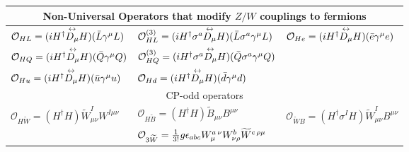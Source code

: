 \begin{table}[h]
\begin{center}
{\begin{tabular}{lll}
  \hline\hline
  \multicolumn{3}{c}{Non-Universal Operators that modify $Z/W$ couplings to fermions}\\
  \hline
            ${\cal O}_{HL}=(i H^\dagger {\overset{\text{\scriptsize$\leftrightarrow$}}{ D_\mu}} H)( \bar L\gamma^\mu L)$     
&         ${\cal O}_{HL}^{(3)}=(i H^\dagger \sigma^a {\overset{\text{\scriptsize$\leftrightarrow$}}{ D_\mu}} H)( \bar L\sigma^a\gamma^\mu L)$  
&            ${\cal O}_{He} =(i H^\dagger {\overset{\text{\scriptsize$\leftrightarrow$}}{ D_\mu}} H)( \bar e \gamma^\mu e )$             \\
            ${\cal O}_{HQ}=(i H^\dagger  {\overset{\text{\scriptsize$\leftrightarrow$}}{ D_\mu}} H)( \bar Q \gamma^\mu Q )$       &
              ${\cal O}_{HQ}^{(3)}=(i H^\dagger \sigma^a {\overset{\text{\scriptsize$\leftrightarrow$}}{ D_\mu}} H)( \bar Q \sigma^a\gamma^\mu Q )$     &   \\
          ${\cal O}_{Hu} =(i H^\dagger {\overset{\text{\scriptsize$\leftrightarrow$}}{ D_\mu}} H)( \bar u \gamma^\mu u )$        
 &            ${\cal O}_{Hd} =(i H^\dagger {\overset{\text{\scriptsize$\leftrightarrow$}}{ D_\mu}} H)( \bar d \gamma^\mu d )$     &      \\ 
  \hline\hline
  \multicolumn{3}{c}{CP-odd operators}\\
  \hline
 $\mathcal{O}_{H \widetilde W} = (H^\dagger H) \widetilde W^{I}_{\mu\nu}W^{I\mu\nu}$    &
 $\mathcal{O}_{H \widetilde B} = (H^\dagger H) \widetilde B_{\mu\nu}B^{\mu\nu}$     &$\mathcal{O}_{ \widetilde W\! B} = ( H^\dagger\sigma ^I H)
\widetilde W_{\mu\nu}^IB^{\mu\nu}$\\
&   ${\cal O}_{3\widetilde W}= \frac{1}{3!} g\epsilon_{abc}W^{a\, \nu}_{\mu}W^{b}_{\nu\rho}\widetilde W^{c\, \rho\mu}$&  \\
\hline\hline
 \end{tabular}
 }
\end{center}
\end{table}
\renewcommand{\arraystretch}{1}



